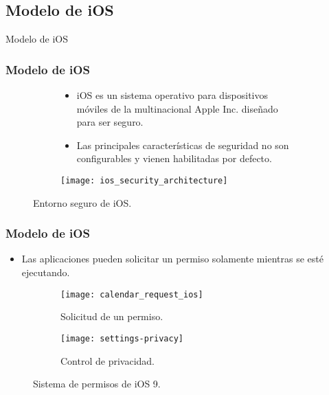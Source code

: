 \subsection{Modelo de iOS}
\begin{frame}
 \begin{center}
  \LARGE Modelo de iOS
 \end{center}
\end{frame}
\begin{frame}
 \frametitle{Modelo de iOS}
 \begin{figure}[tH]
  \begin{subfigure}{0.7\linewidth}
   \begin{itemize}
    \item iOS es un sistema operativo para dispositivos móviles de la multinacional Apple Inc. diseñado para ser
seguro. \pause
    \item Las principales características de seguridad no son configurables y vienen habilitadas por defecto.
   \end{itemize}
  \end{subfigure}
  \begin{subfigure}{0.25\linewidth}\pause
    \centering
    \texttt{[image: ios\_security\_architecture]}
  \end{subfigure}
  \caption{Entorno seguro de iOS.}
\end{figure}
\end{frame}
\begin{frame}
 \frametitle{Modelo de iOS}
 \begin{itemize}
  \item Las aplicaciones pueden solicitar un permiso solamente mientras se esté ejecutando. \pause
 \end{itemize}
 \begin{figure}[hbtp]
    \centering
    \begin{subfigure}{0.49\linewidth}
    \centering
    \texttt{[image: calendar\_request\_ios]}
    \caption{Solicitud de un permiso.}
    \end{subfigure}
    \begin{subfigure}{0.49\linewidth}
    \centering
     \texttt{[image: settings-privacy]}
    \caption{Control de privacidad.}
    \end{subfigure}
    \caption{Sistema de permisos de iOS 9.}
 \end{figure}
\end{frame}
